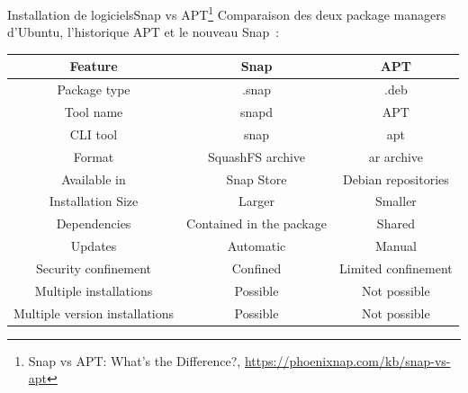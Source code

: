 \documentclass{beamer}
\begin{document}
    \begin{frame}{Installation de logiciels}{Snap vs APT\footnote{Snap vs APT: What's the Difference?, \url{https://phoenixnap.com/kb/snap-vs-apt}}}
        Comparaison des deux package managers d'Ubuntu, l'historique APT et le nouveau Snap~:
        \begin{small}
            \begin{table}[h!]
                \centering
                \begin{tabular}{|c|c|c|}
                    \hline
                    \textbf{Feature}               & \textbf{Snap}            & \textbf{APT}        \\
                    \hline
                    Package type                   & .snap                    & .deb                \\
                    \hline
                    Tool name                      & snapd                    & APT                 \\
                    \hline
                    CLI tool                       & snap                     & apt                 \\
                    \hline
                    Format                         & SquashFS archive         & ar archive          \\
                    \hline
                    Available in                   & Snap Store               & Debian repositories \\
                    \hline
                    Installation Size              & Larger                   & Smaller             \\
                    \hline
                    Dependencies                   & Contained in the package & Shared              \\
                    \hline
                    Updates                        & Automatic                & Manual              \\
                    \hline
                    Security confinement           & Confined                 & Limited confinement \\
                    \hline
                    Multiple installations         & Possible                 & Not possible        \\
                    \hline
                    Multiple version installations & Possible                 & Not possible        \\
                    \hline
                \end{tabular}
            \end{table}
        \end{small}
    \end{frame}
\end{document}
